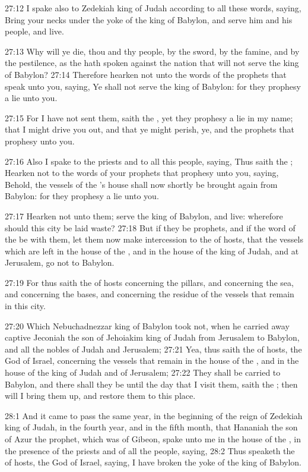 27:12 I spake also to Zedekiah king of Judah according to all these words, saying, Bring your necks under the yoke of the king of Babylon, and serve him and his people, and live.

27:13 Why will ye die, thou and thy people, by the sword, by the famine, and by the pestilence, as the \LORD hath spoken against the nation that will not serve the king of Babylon?  27:14 Therefore hearken not unto the words of the prophets that speak unto you, saying, Ye shall not serve the king of Babylon: for they prophesy a lie unto you.

27:15 For I have not sent them, saith the \LORD, yet they prophesy a lie in my name; that I might drive you out, and that ye might perish, ye, and the prophets that prophesy unto you.

27:16 Also I spake to the priests and to all this people, saying, Thus saith the \LORD; Hearken not to the words of your prophets that prophesy unto you, saying, Behold, the vessels of the \LORD's house shall now shortly be brought again from Babylon: for they prophesy a lie unto you.

27:17 Hearken not unto them; serve the king of Babylon, and live: wherefore should this city be laid waste?  27:18 But if they be prophets, and if the word of the \LORD be with them, let them now make intercession to the \LORD of hosts, that the vessels which are left in the house of the \LORD, and in the house of the king of Judah, and at Jerusalem, go not to Babylon.

27:19 For thus saith the \LORD of hosts concerning the pillars, and concerning the sea, and concerning the bases, and concerning the residue of the vessels that remain in this city.

27:20 Which Nebuchadnezzar king of Babylon took not, when he carried away captive Jeconiah the son of Jehoiakim king of Judah from Jerusalem to Babylon, and all the nobles of Judah and Jerusalem; 27:21 Yea, thus saith the \LORD of hosts, the God of Israel, concerning the vessels that remain in the house of the \LORD, and in the house of the king of Judah and of Jerusalem; 27:22 They shall be carried to Babylon, and there shall they be until the day that I visit them, saith the \LORD; then will I bring them up, and restore them to this place.

28:1 And it came to pass the same year, in the beginning of the reign of Zedekiah king of Judah, in the fourth year, and in the fifth month, that Hananiah the son of Azur the prophet, which was of Gibeon, spake unto me in the house of the \LORD, in the presence of the priests and of all the people, saying, 28:2 Thus speaketh the \LORD of hosts, the God of Israel, saying, I have broken the yoke of the king of Babylon.

